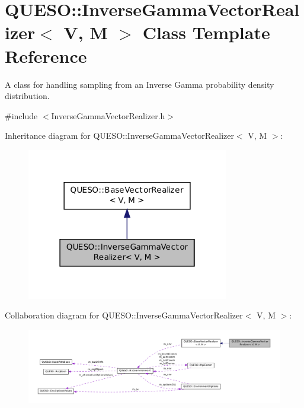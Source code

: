 \hypertarget{class_q_u_e_s_o_1_1_inverse_gamma_vector_realizer}{\section{Q\-U\-E\-S\-O\-:\-:Inverse\-Gamma\-Vector\-Realizer$<$ V, M $>$ Class Template Reference}
\label{class_q_u_e_s_o_1_1_inverse_gamma_vector_realizer}
}


A class for handling sampling from an Inverse Gamma probability density distribution.  




{\ttfamily \#include $<$Inverse\-Gamma\-Vector\-Realizer.\-h$>$}



Inheritance diagram for Q\-U\-E\-S\-O\-:\-:Inverse\-Gamma\-Vector\-Realizer$<$ V, M $>$\-:
\nopagebreak
\begin{figure}[H]
\begin{center}
\leavevmode
\includegraphics[width=250pt]{class_q_u_e_s_o_1_1_inverse_gamma_vector_realizer__inherit__graph}
\end{center}
\end{figure}


Collaboration diagram for Q\-U\-E\-S\-O\-:\-:Inverse\-Gamma\-Vector\-Realizer$<$ V, M $>$\-:
\nopagebreak
\begin{figure}[H]
\begin{center}
\leavevmode
\includegraphics[width=350pt]{class_q_u_e_s_o_1_1_inverse_gamma_vector_realizer__coll__graph}
\end{center}
\end{figure}
